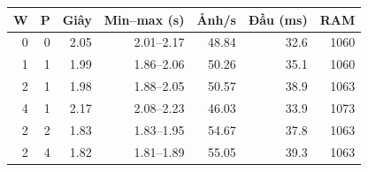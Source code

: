 \begin{tabular}{rrrrrrr}
\toprule
W & P & Giây & Min--max (s) & Ảnh/s & Đầu (ms) & RAM \\
\midrule
0 & 0 & 2.05 & 2.01--2.17 & 48.84 & 32.6 & 1060 \\
1 & 1 & 1.99 & 1.86--2.06 & 50.26 & 35.1 & 1060 \\
2 & 1 & 1.98 & 1.88--2.05 & 50.57 & 38.9 & 1063 \\
4 & 1 & 2.17 & 2.08--2.23 & 46.03 & 33.9 & 1073 \\
2 & 2 & 1.83 & 1.83--1.95 & 54.67 & 37.8 & 1063 \\
2 & 4 & 1.82 & 1.81--1.89 & 55.05 & 39.3 & 1063 \\
\bottomrule
\end{tabular}
